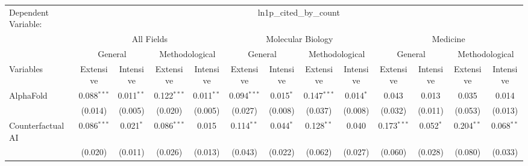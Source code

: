\begingroup
\centering
\begin{tabular}{lcccccccccccc}
   \tabularnewline \midrule \midrule
   Dependent Variable: & \multicolumn{12}{c}{ln1p\_cited\_by\_count}\\
 & \multicolumn{4}{c}{All Fields} & \multicolumn{4}{c}{Molecular Biology} & \multicolumn{4}{c}{Medicine} \\
\cmidrule(lr){2-5} \cmidrule(lr){6-9} \cmidrule(lr){10-13}
 & \multicolumn{2}{c}{General} & \multicolumn{2}{c}{Methodological} & \multicolumn{2}{c}{General} & \multicolumn{2}{c}{Methodological} & \multicolumn{2}{c}{General} & \multicolumn{2}{c}{Methodological} \\
\cmidrule(lr){2-3} \cmidrule(lr){4-5} \cmidrule(lr){6-7} \cmidrule(lr){8-9} \cmidrule(lr){10-11} \cmidrule(lr){12-13}
Variables & \multicolumn{1}{c}{Extensive} & \multicolumn{1}{c}{Intensive} & \multicolumn{1}{c}{Extensive} & \multicolumn{1}{c}{Intensive} & \multicolumn{1}{c}{Extensive} & \multicolumn{1}{c}{Intensive} & \multicolumn{1}{c}{Extensive} & \multicolumn{1}{c}{Intensive} & \multicolumn{1}{c}{Extensive} & \multicolumn{1}{c}{Intensive} & \multicolumn{1}{c}{Extensive} & \multicolumn{1}{c}{Intensive} \\
\cmidrule(lr){1-1}\cmidrule(lr){2-2} \cmidrule(lr){3-3} \cmidrule(lr){4-4} \cmidrule(lr){5-5} \cmidrule(lr){6-6} \cmidrule(lr){7-7} \cmidrule(lr){8-8} \cmidrule(lr){9-9} \cmidrule(lr){10-10} \cmidrule(lr){11-11} \cmidrule(lr){12-12} \cmidrule(lr){13-13}
   AlphaFold                                & 0.088$^{***}$ & 0.011$^{**}$    & 0.122$^{***}$ & 0.011$^{**}$   & 0.094$^{***}$ & 0.015$^{*}$   & 0.147$^{***}$ & 0.014$^{*}$   & 0.043         & 0.013         & 0.035        & 0.014\\   
                                            & (0.014)       & (0.005)         & (0.020)       & (0.005)        & (0.027)       & (0.008)       & (0.037)       & (0.008)       & (0.032)       & (0.011)       & (0.053)      & (0.013)\\   
   Counterfactual AI                        & 0.086$^{***}$ & 0.021$^{*}$     & 0.086$^{***}$ & 0.015          & 0.114$^{**}$  & 0.044$^{*}$   & 0.128$^{**}$  & 0.040         & 0.173$^{***}$ & 0.052$^{*}$   & 0.204$^{**}$ & 0.068$^{**}$\\   
                                            & (0.020)       & (0.011)         & (0.026)       & (0.013)        & (0.043)       & (0.022)       & (0.062)       & (0.027)       & (0.060)       & (0.028)       & (0.080)      & (0.033)\\   

\end{tabular}
